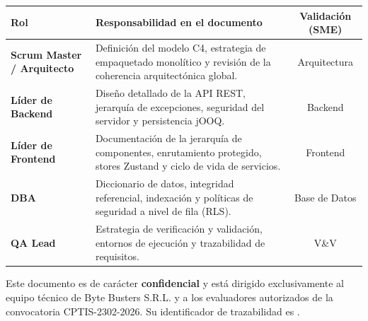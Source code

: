\vspace{0.2cm}
\noindent
\renewcommand{\arraystretch}{1.4}
\fontsize{9}{10.8}\selectfont\sffamily
\begin{tabularx}{\textwidth}{|>{\bfseries\color{colorPrimario}}l|X|c|}
\hline
\rowcolor{headerTabla}
\textbf{Rol} & \textbf{Responsabilidad en el documento} & \textbf{Validación (SME)} \\
\hline
Scrum Master / Arquitecto & Definición del modelo C4, estrategia de empaquetado monolítico y revisión de la coherencia arquitectónica global. & Arquitectura \\
\hline
\rowcolor{grisTecnico}
Líder de Backend & Diseño detallado de la API REST, jerarquía de excepciones, seguridad del servidor y persistencia jOOQ. & Backend \\
\hline
Líder de Frontend & Documentación de la jerarquía de componentes, enrutamiento protegido, stores Zustand y ciclo de vida de servicios. & Frontend \\
\hline
\rowcolor{grisTecnico}
DBA & Diccionario de datos, integridad referencial, indexación y políticas de seguridad a nivel de fila (RLS). & Base de Datos \\
\hline
QA Lead & Estrategia de verificación y validación, entornos de ejecución y trazabilidad de requisitos. & V\&V \\
\hline
\end{tabularx}

\vspace{0.4cm}
\begin{NotaTecnica}
Este documento es de carácter \textbf{confidencial} y está dirigido exclusivamente al
equipo técnico de Byte Busters S.R.L. y a los evaluadores autorizados de la
convocatoria CPTIS-2302-2026. Su identificador de trazabilidad es
.
\end{NotaTecnica}
